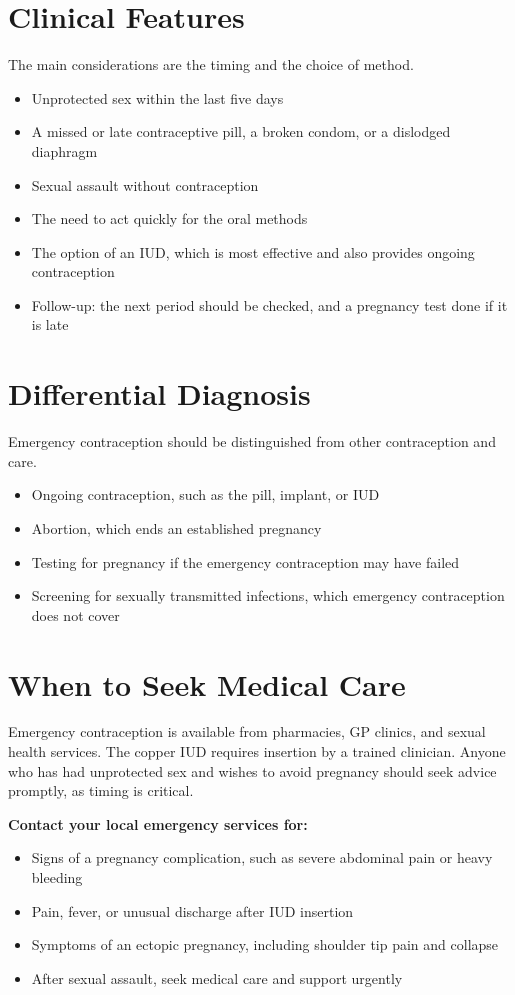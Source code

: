 \section*{Clinical Features}
The main considerations are the timing and the choice of method.
\begin{itemize}
    \item Unprotected sex within the last five days
    \item A missed or late contraceptive pill, a broken condom, or a dislodged diaphragm
    \item Sexual assault without contraception
    \item The need to act quickly for the oral methods
    \item The option of an IUD, which is most effective and also provides ongoing contraception
    \item Follow-up: the next period should be checked, and a pregnancy test done if it is late
\end{itemize}

\section*{Differential Diagnosis}
Emergency contraception should be distinguished from other contraception and care.
\begin{itemize}
    \item Ongoing contraception, such as the pill, implant, or IUD
    \item Abortion, which ends an established pregnancy
    \item Testing for pregnancy if the emergency contraception may have failed
    \item Screening for sexually transmitted infections, which emergency contraception does not cover
\end{itemize}

\section*{When to Seek Medical Care}
Emergency contraception is available from pharmacies, GP clinics, and sexual health services. The copper IUD requires insertion by a trained clinician. Anyone who has had unprotected sex and wishes to avoid pregnancy should seek advice promptly, as timing is critical.

\textbf{Contact your local emergency services for:}
\begin{itemize}
    \item Signs of a pregnancy complication, such as severe abdominal pain or heavy bleeding
    \item Pain, fever, or unusual discharge after IUD insertion
    \item Symptoms of an ectopic pregnancy, including shoulder tip pain and collapse
    \item After sexual assault, seek medical care and support urgently
\end{itemize}

